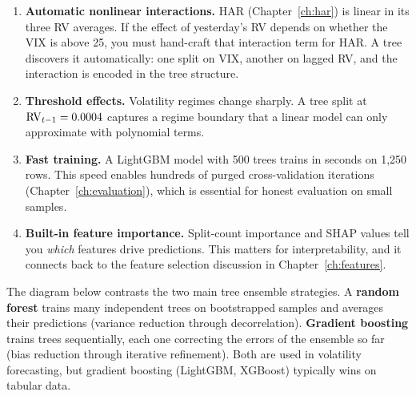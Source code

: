 \begin{enumerate}[leftmargin=1.8em]
\item \textbf{Automatic nonlinear interactions.}
  HAR (Chapter~\ref{ch:har}) is linear in its three RV averages.  If the
  effect of yesterday's RV depends on whether the VIX is above 25, you must
  hand-craft that interaction term for HAR.  A tree discovers it
  automatically: one split on VIX, another on lagged RV, and the interaction
  is encoded in the tree structure.

\item \textbf{Threshold effects.}
  Volatility regimes change sharply.  A tree split at
  $\operatorname{RV}_{t-1} = 0.0004$ captures a regime boundary that a linear model can
  only approximate with polynomial terms.

\item \textbf{Fast training.}
  A LightGBM model with 500 trees trains in seconds on 1,250 rows.
  This speed enables hundreds of purged cross-validation iterations
  (Chapter~\ref{ch:evaluation}), which is essential for honest evaluation on
  small samples.

\item \textbf{Built-in feature importance.}
  Split-count importance and SHAP values tell you \emph{which} features
  drive predictions.  This matters for interpretability, and it connects back
  to the feature selection discussion in Chapter~\ref{ch:features}.
\end{enumerate}

The diagram below contrasts the two main tree ensemble strategies.  A
\textbf{random forest} trains many independent trees on bootstrapped samples
and averages their predictions (variance reduction through decorrelation).
\textbf{Gradient boosting} trains trees sequentially, each one correcting the
errors of the ensemble so far (bias reduction through iterative refinement).
Both are used in volatility forecasting, but gradient boosting (LightGBM,
XGBoost) typically wins on tabular data.

